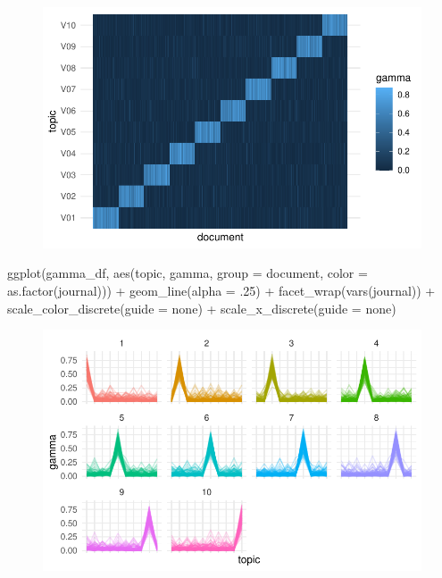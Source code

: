 \documentclass[
]{article}
\newenvironment{Shaded}{\begin{snugshade}}{\end{snugshade}}
\newcommand{\AttributeTok}[1]{\textcolor[rgb]{0.40,0.45,0.13}{#1}}
\newcommand{\DecValTok}[1]{\textcolor[rgb]{0.68,0.00,0.00}{#1}}
\newcommand{\FunctionTok}[1]{\textcolor[rgb]{0.28,0.35,0.67}{#1}}
\newcommand{\NormalTok}[1]{\textcolor[rgb]{0.00,0.23,0.31}{#1}}
\newcommand{\SpecialCharTok}[1]{\textcolor[rgb]{0.37,0.37,0.37}{#1}}
\newcommand{\StringTok}[1]{\textcolor[rgb]{0.13,0.47,0.30}{#1}}
\begin{document}
\begin{figure}[H]

{\centering \includegraphics{paper_files/figure-pdf/unnamed-chunk-20-1.pdf}

}

\end{figure}

\begin{Shaded}
\begin{Highlighting}[]
\FunctionTok{ggplot}\NormalTok{(gamma\_df, }
       \FunctionTok{aes}\NormalTok{(topic, gamma, }
           \AttributeTok{group =}\NormalTok{ document, }
           \AttributeTok{color =} \FunctionTok{as.factor}\NormalTok{(journal))) }\SpecialCharTok{+}
    \FunctionTok{geom\_line}\NormalTok{(}\AttributeTok{alpha =}\NormalTok{ .}\DecValTok{25}\NormalTok{) }\SpecialCharTok{+}
    \FunctionTok{facet\_wrap}\NormalTok{(}\FunctionTok{vars}\NormalTok{(journal)) }\SpecialCharTok{+}
    \FunctionTok{scale\_color\_discrete}\NormalTok{(}\AttributeTok{guide =} \StringTok{\textquotesingle{}none\textquotesingle{}}\NormalTok{) }\SpecialCharTok{+}
    \FunctionTok{scale\_x\_discrete}\NormalTok{(}\AttributeTok{guide =} \StringTok{\textquotesingle{}none\textquotesingle{}}\NormalTok{)}
\end{Highlighting}
\end{Shaded}

\begin{figure}[H]

{\centering \includegraphics{paper_files/figure-pdf/unnamed-chunk-20-2.pdf}

}

\end{figure}
\end{document}

